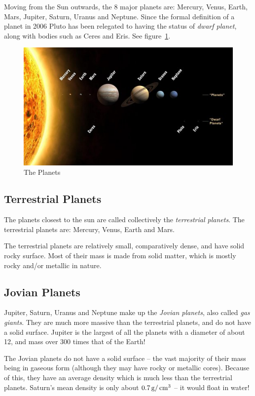 Moving from the Sun outwards, the 8 major planets are: Mercury, Venus,
Earth, Mars, Jupiter, Saturn, Uranus and Neptune. Since the formal
definition of a planet in 2006 Pluto has been relegated to having the
status of \emph{dwarf planet}, along with bodies such as Ceres and Eris.
See figure~\ref{fig:planets}.

\begin{figure}[tb]
  \centering
  \includegraphics[width=0.9\linewidth]{pictures/the_planets.jpg}
  \caption{The Planets}
  \label{fig:planets}
\end{figure}


\subsection{Terrestrial Planets}%

The planets closest to the sun are called collectively the
\emph{terrestrial planets}. The terrestrial planets are: Mercury, Venus,
Earth and Mars.

The terrestrial planets are relatively small, comparatively dense, and
have solid rocky surface. Most of their mass is made from solid matter,
which is mostly rocky and/or metallic in nature.

\subsection{Jovian Planets}%

Jupiter, Saturn, Uranus and Neptune make up the \emph{Jovian planets},
also called \emph{gas giants}. They are much more massive than the
terrestrial planets, and do not have a solid surface. Jupiter is the
largest of all the planets with a diameter of about 12, and mass over
300 times that of the Earth!

The Jovian planets do not have a solid surface -- the vast majority of
their mass being in gaseous form (although they may have rocky or
metallic cores). Because of this, they have an average density which is
much less than the terrestrial planets. Saturn's mean density is only
about $0.7 \g/\cm^3$ -- it would float in water!

